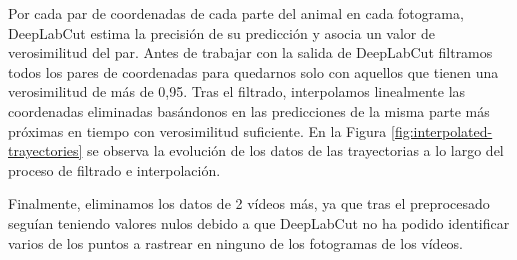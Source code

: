 Por cada par de coordenadas de cada parte del animal en cada fotograma, DeepLabCut estima la precisión de su predicción y asocia un valor de verosimilitud del par. Antes de trabajar con la salida de DeepLabCut filtramos todos los pares de coordenadas para quedarnos solo con aquellos que tienen una verosimilitud de más de 0,95. Tras el filtrado, interpolamos linealmente las coordenadas eliminadas basándonos en las predicciones de la misma parte más próximas en tiempo con verosimilitud suficiente. En la Figura \ref{fig:interpolated-trayectories} se observa la evolución de los datos de las trayectorias a lo largo del proceso de filtrado e interpolación.

Finalmente, eliminamos los datos de 2 vídeos más, ya que tras el preprocesado seguían teniendo valores nulos debido a que DeepLabCut no ha podido identificar varios de los puntos a rastrear en ninguno de los fotogramas de los vídeos. 

